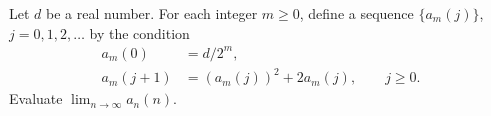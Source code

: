 Let $d$ be a real number. For each integer $m \geq 0$, define a
sequence $\{a_m(j)\}$, $j=0,1,2,\dots$ by the condition
\begin{align*}
a_m(0) &= d/2^m, \\
a_m(j+1) &= (a_m(j))^2 + 2a_m(j), \qquad j \geq 0.
\end{align*}
Evaluate $\lim_{n \to \infty} a_n(n)$.
